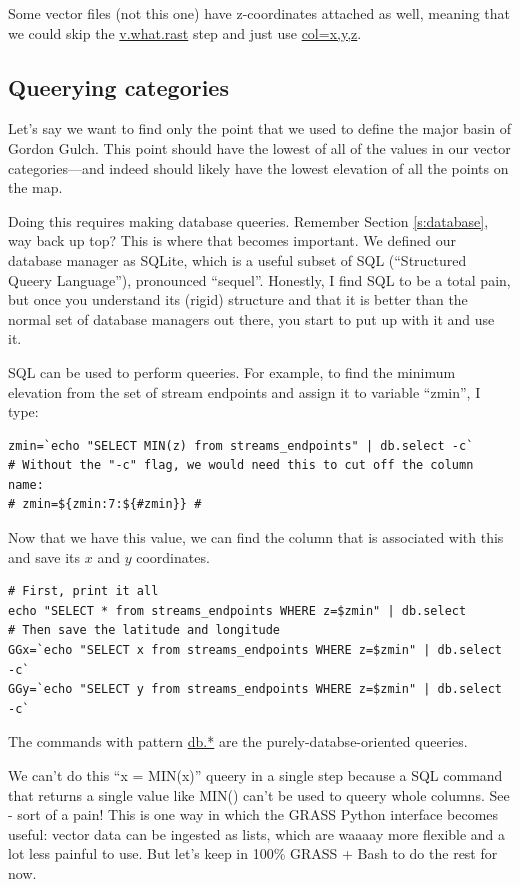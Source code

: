 \documentclass{book}
\begin{document}
Some vector files (not this one) have z-coordinates attached as well, meaning that we could skip the \url{v.what.rast} step and just use \url{col=x,y,z}.

\subsection{Queerying categories}

Let's say we want to find only the point that we used to define the major basin of Gordon Gulch. This point should have the lowest of all of the values in our vector categories---and indeed should likely have the lowest elevation of all the points on the map.

Doing this requires making database queeries. Remember Section \ref{s:database}, way back up top? This is where that becomes important. We defined our database manager as SQLite, which is a useful subset of SQL (``Structured Queery Language''), pronounced ``sequel''. Honestly, I find SQL to be a total pain, but once you understand its (rigid) structure and that it is better than the normal set of database managers out there, you start to put up with it and use it.

SQL can be used to perform queeries. For example, to find the minimum elevation from the set of stream endpoints and assign it to variable ``zmin'', I type:

\begin{lstlisting}
zmin=`echo "SELECT MIN(z) from streams_endpoints" | db.select -c`
# Without the "-c" flag, we would need this to cut off the column name:
# zmin=${zmin:7:${#zmin}} # 
\end{lstlisting}

Now that we have this value, we can find the column that is associated with this and save its $x$ and $y$ coordinates.

\begin{lstlisting}
# First, print it all
echo "SELECT * from streams_endpoints WHERE z=$zmin" | db.select
# Then save the latitude and longitude
GGx=`echo "SELECT x from streams_endpoints WHERE z=$zmin" | db.select -c`
GGy=`echo "SELECT y from streams_endpoints WHERE z=$zmin" | db.select -c`
\end{lstlisting}

The commands with pattern \url{db.*} are the purely-databse-oriented queeries.

We can't do this ``x = MIN(x)'' queery in a single step because a SQL command that returns a single value like MIN() can't be used to queery whole columns. See - sort of a pain! This is one way in which the GRASS Python interface becomes useful: vector data can be ingested as lists, which are waaaay more flexible and a lot less painful to use. But let's keep in 100\% GRASS + Bash to do the rest for now.
\end{document}
